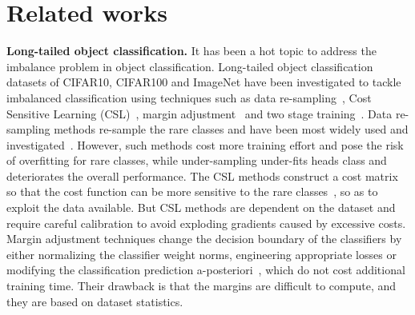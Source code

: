 \documentclass[runningheads]{llncs}
\begin{document}
\section{Related works}
\label{sec:related}
\noindent \textbf{Long-tailed  object classification.} It has been a hot topic to address the imbalance problem in object classification. Long-tailed object classification datasets of CIFAR10, CIFAR100 and ImageNet have been investigated to tackle imbalanced classification using techniques such as data re-sampling~\cite{chawla2002smote,mahajan2018exploring,shen2016relay,zou2018unsupervised}, Cost Sensitive Learning (CSL)~\cite{cui2019class,khan2017cost}, margin adjustment~\cite{menon2021longtail,kim2020adjusting,cao2019learning,Ren2020balms} and two stage training~\cite{kang2019decoupling,wang2020devil}. Data
re-sampling methods re-sample the rare classes and have been most widely used and investigated~\cite{chawla2002smote,mahajan2018exploring,shen2016relay,zou2018unsupervised}. However, such methods cost more training effort and pose the risk of overfitting for rare classes, while under-sampling under-fits heads class and deteriorates the overall performance. The CSL methods construct a cost matrix so that the cost function can be more sensitive to the rare classes~\cite{cui2019class,khan2017cost}, so as to exploit the data available. But CSL methods are dependent on the dataset and require careful calibration to avoid exploding gradients caused by excessive costs. Margin adjustment techniques change the decision boundary of the classifiers by either normalizing the classifier weight norms, engineering appropriate losses or modifying the classification prediction a-posteriori~\cite{menon2021longtail,kim2020adjusting,cao2019learning,Ren2020balms}, which do not cost additional training time. Their drawback is that the margins are difficult to compute, and they are based on dataset statistics.
\end{document}
